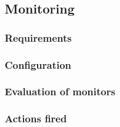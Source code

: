 

\subsection{Monitoring}\label{sec:monitoring}

\subsubsection{Requirements}

\subsubsection{Configuration}

\subsubsection{Evaluation of monitors}

\subsubsection{Actions fired}
